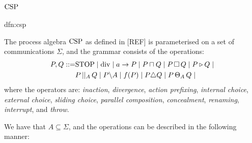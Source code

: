 \documentclass[../hons_project.tex]{subfiles}
\begin{document}
\section{\texorpdfstring{$\mathrm{CSP}$}{CSP}}\label{ssec:CSP}
\begin{dfn}{dfn:csp}{}

   The process algebra $\mathrm{CSP}$ as defined in [REF] is parameterised on a set of communications $\Sigma$, and the grammar consists of the operations:
   \begin{align*}
      P, Q ::= &\mathrm{STOP} \mid \mathrm{div} \mid a\to P \mid P \sqcap Q \mid P \,\square\, Q \mid P \triangleright Q \mid \\
	       &P \,\vert\vert_{A}\, Q \mid P \backslash A \mid f(P) \mid P \triangle Q \mid P \,\Theta_{A}\, Q \mid 
   \end{align*}
   where the operators are: \textit{inaction}, \textit{divergence}, \textit{action prefixing}, \textit{internal choice}, \textit{external choice}, \textit{sliding choice}, \textit{parallel composition}, \textit{concealment}, \textit{renaming}, \textit{interrupt}, and \textit{throw}.
\end{dfn}
We have that $A \subseteq \Sigma$, and the operations can be described in the following manner:
\end{document}
